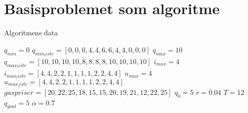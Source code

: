 \section{Basisproblemet som algoritme}
\begin{algorithm}[H] 
\caption{Algoritmens data}
\begin{algorithmic}[1]
\State $q_{min}=0$
\State $q_{min_liste}=[0,0,0,4,4,6,6,4,4,0,0,0]$
\State $q_{max}=10$
\State $q_{max_liste}=[10,10,10,10,8,8,8,8,10,10,10,10]$
\State $i_{max}=4$
\State $i_{max_liste}=[4,4,2,2,1,1,1,1,2,2,4,4]$
\State $u_{max}=4$
\State $u_{max_liste}=[4,4,2,2,1,1,1,1,2,2,4,4]$
\State $gaspriser=[20,22,25,18,15,15,20,19,21,12,22,25]$
\State $q_{0}=5$
\State $r=0.04$
\State $T=12$
\State $q_{goal}=5$
\State $\alpha=0.7$

\end{algorithmic}
\label{alg:lineaer}
\end{algorithm}
